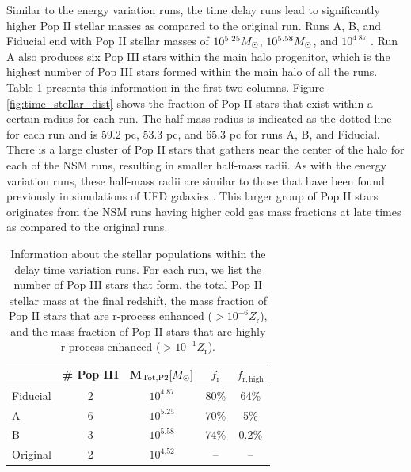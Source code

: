 \documentclass[fleqn,usenatbib]{mnras}
\begin{document}
Similar to the energy variation runs, the time delay runs lead to significantly higher Pop II stellar masses as compared to the original run. Runs A, B, and Fiducial end with Pop II stellar masses of $10^{5.25}\Ms$, $10^{5.58} \Ms$, and $10^{4.87}$ \Ms. Run A also produces six Pop III stars within the main halo progenitor, which is the highest number of Pop III stars formed within the main halo of all the runs. Table \ref{tab:time_stellar} presents this information in the first two columns. Figure \ref{fig:time_stellar_dist} shows the fraction of Pop II stars that exist within a certain radius for each run. The half-mass radius is indicated as the dotted line for each run and is 59.2 pc, 53.3 pc, and 65.3 pc for runs A, B, and Fiducial. There is a large cluster of Pop II stars that gathers near the center of the halo for each of the NSM runs, resulting in smaller half-mass radii. As with the energy variation runs, these half-mass radii are similar to those that have been found previously in simulations of UFD galaxies \citep{Ricotti16}. This larger group of Pop II stars originates from the NSM runs having higher cold gas mass fractions at late times as compared to the original runs. 

\begin{table}
	\centering
	\begin{tabular}{lcccc} 
		\hline
		 & \# Pop III & M$_{\mathrm{Tot, P2}} [\Ms]$ & $f_{\mathrm{r}}$ & $f_{\mathrm{r, high}}$ \\
		\hline
		Fiducial & 2 & $10^{4.87}$ & 80\% & 64\% \\
		A & 6 & $10^{5.25}$ & 70\% & 5\% \\
		B & 3 & $10^{5.58}$ & 74\% & 0.2\% \\
		Original & 2 & $10^{4.52}$ & -- & -- \\
		\hline
	\end{tabular}
	\caption[Information about the stellar populations within the delay time variation runs.]{Information about the stellar populations within the delay time variation runs. For each run, we list the number of Pop III stars that form, the total Pop II stellar mass at the final redshift, the mass fraction of Pop II stars that are r-process enhanced ($> 10^{-6} Z_{\mathrm{r}}$), and the mass fraction of Pop II stars that are highly r-process enhanced ($> 10^{-1} Z_{\mathrm{r}}$).}
	\label{tab:time_stellar}
\end{table}
\end{document}
